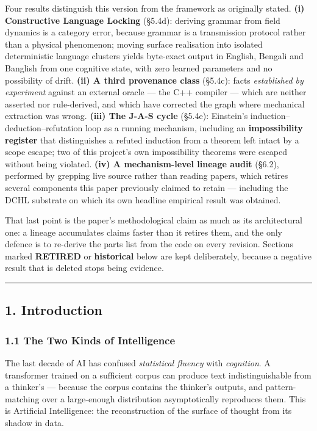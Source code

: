 \documentclass[
  11pt,
  a4paper,
]{article}
\begin{document}
Four results distinguish this version from the framework as originally
stated. \textbf{(i) Constructive Language Locking} (§5.4d): deriving
grammar from field dynamics is a category error, because grammar is a
transmission protocol rather than a physical phenomenon; moving surface
realisation into isolated deterministic language clusters yields
byte-exact output in English, Bengali and Banglish from one cognitive
state, with zero learned parameters and no possibility of drift.
\textbf{(ii) A third provenance class} (§5.4c): facts \emph{established
by experiment} against an external oracle --- the C++ compiler --- which
are neither asserted nor rule-derived, and which have corrected the
graph where mechanical extraction was wrong. \textbf{(iii) The J-A-S
cycle} (§5.4e): Einstein's induction--deduction--refutation loop as a
running mechanism, including an \textbf{impossibility register} that
distinguishes a refuted induction from a theorem left intact by a scope
escape; two of this project's own impossibility theorems were escaped
without being violated. \textbf{(iv) A mechanism-level lineage audit}
(§6.2), performed by grepping live source rather than reading papers,
which retires several components this paper previously claimed to retain
--- including the DCHL substrate on which its own headline empirical
result was obtained.

That last point is the paper's methodological claim as much as its
architectural one: a lineage accumulates claims faster than it retires
them, and the only defence is to re-derive the parts list from the code
on every revision. Sections marked \textbf{RETIRED} or
\textbf{historical} below are kept deliberately, because a negative
result that is deleted stops being evidence.

\begin{center}\rule{0.5\linewidth}{0.5pt}\end{center}

\subsection{1. Introduction}\label{introduction}

\subsubsection{1.1 The Two Kinds of
Intelligence}\label{the-two-kinds-of-intelligence}

The last decade of AI has confused \emph{statistical fluency} with
\emph{cognition}. A transformer trained on a sufficient corpus can
produce text indistinguishable from a thinker's --- because the corpus
contains the thinker's outputs, and pattern-matching over a large-enough
distribution asymptotically reproduces them. This is Artificial
Intelligence: the reconstruction of the surface of thought from its
shadow in data.
\end{document}
